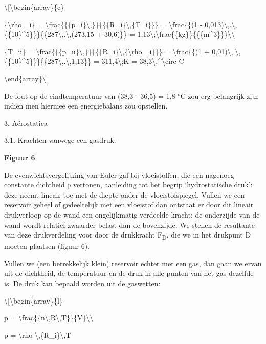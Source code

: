 \documentclass[]{article}
\begin{document}
\textbackslash{}{[}\textbackslash{}begin\{array\}\{c\}

\{\textbackslash{}rho \_i\} =
\textbackslash{}frac\{\{\{p\_i\}\textbackslash{},\}\}\{\{\{R\_i\}\textbackslash{},\{T\_i\}\}\}
= \textbackslash{}frac\{\{(1 -
0,013)\textbackslash{},.\textbackslash{},\{\{10\}\^{}5\}\}\}\{\{287\textbackslash{},.\textbackslash{},(273,15
+ 30,6)\}\} =
1,13\textbackslash{};\textbackslash{}frac\{\{kg\}\}\{\{\{m\^{}3\}\}\}\textbackslash{}\textbackslash{}

\{T\_u\} =
\textbackslash{}frac\{\{\{p\_u\}\textbackslash{},\}\}\{\{\{R\_i\}\textbackslash{},\{\textbackslash{}rho
\_i\}\}\} = \textbackslash{}frac\{\{(1 +
0,01)\textbackslash{},.\textbackslash{},\{\{10\}\^{}5\}\}\}\{\{287\textbackslash{},.\textbackslash{},1,13\}\}
= 311,4\textbackslash{};K =
38,3\textbackslash{},\^{}\textbackslash{}circ C

\textbackslash{}end\{array\}\textbackslash{}{]}

De fout op de eindtemperatuur van (38,3 - 36,5) = 1,8 °C zou erg
belangrijk zijn indien men hiermee een energiebalans zou opstellen.

3. Aërostatica

3.1. Krachten vanwege een gasdruk.

\textbf{Figuur 6 }

De evenwichtsvergelijking van Euler gaf bij vloeistoffen, die een
nagenoeg constante dichtheid ρ vertonen, aanleiding tot het begrip
`hydrostatische druk': deze neemt lineair toe met de diepte onder de
vloeistofspiegel. Vullen we een reservoir geheel of gedeeltelijk met een
vloeistof dan ontstaat er door dit lineair drukverloop op de wand een
ongelijkmatig verdeelde kracht: de onderzijde van de wand wordt relatief
zwaarder belast dan de bovenzijde. We stellen de resultante van deze
drukverdeling voor door de drukkracht F\textsubscript{D}, die we in het
drukpunt D moeten plaatsen (figuur 6).

Vullen we (een betrekkelijk klein) reservoir echter met een gas, dan
gaan we ervan uit de dichtheid, de temperatuur en de druk in alle punten
van het gas dezelfde is. De druk kan bepaald worden uit de gaswetten:

\textbackslash{}{[}\textbackslash{}begin\{array\}\{l\}

p =
\textbackslash{}frac\{\{n\textbackslash{},R\textbackslash{},T\}\}\{V\}\textbackslash{}\textbackslash{}

p = \textbackslash{}rho \textbackslash{},\{R\_i\}\textbackslash{},T
\end{document}
